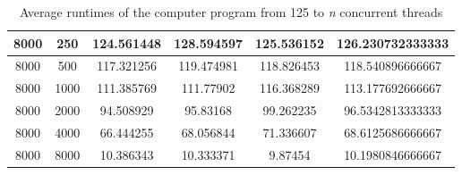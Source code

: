 \documentclass{article}
\begin{document}
\begin{table}[H]
{\begin{tabular}{|c|c|ccc|c|}
        8000                                                                                   & 250                                                                                                     & \multicolumn{1}{c|}{124.561448}       & \multicolumn{1}{c|}{128.594597}      & 125.536152      & 126.230732333333                                                                           \\ \hline
        8000                                                                                   & 500                                                                                                     & \multicolumn{1}{c|}{117.321256}       & \multicolumn{1}{c|}{119.474981}      & 118.826453      & 118.540896666667                                                                           \\ \hline
        8000                                                                                   & 1000                                                                                                    & \multicolumn{1}{c|}{111.385769}       & \multicolumn{1}{c|}{111.77902}       & 116.368289      & 113.177692666667                                                                           \\ \hline
        8000                                                                                   & 2000                                                                                                    & \multicolumn{1}{c|}{94.508929}        & \multicolumn{1}{c|}{95.83168}        & 99.262235       & 96.5342813333333                                                                           \\ \hline
        8000                                                                                   & 4000                                                                                                    & \multicolumn{1}{c|}{66.444255}        & \multicolumn{1}{c|}{68.056844}       & 71.336607       & 68.6125686666667                                                                           \\ \hline
        8000                                                                                   & 8000                                                                                                    & \multicolumn{1}{c|}{10.386343}        & \multicolumn{1}{c|}{10.333371}       & 9.87454         & 10.1980846666667                                                                           \\ \hline
        \end{tabular}
    }
    \caption{\label{table}Average runtimes of the computer program from 125 to \emph{n} concurrent threads}
    \end{table}
\end{document}
